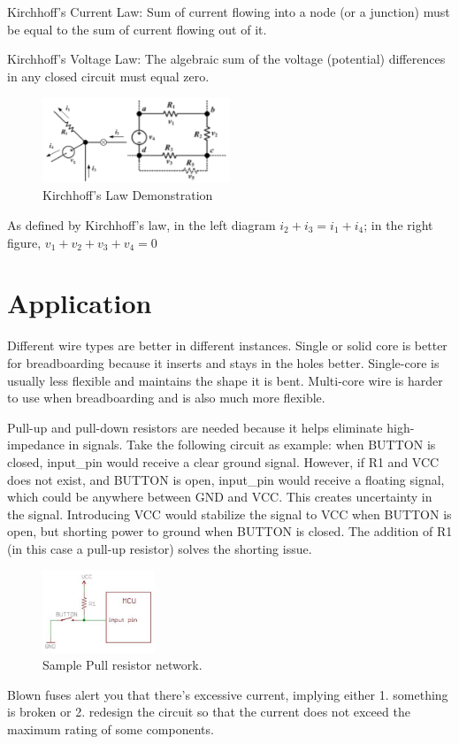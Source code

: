 \documentclass{article}
\begin{document}
Kirchhoff's Current Law: Sum of current flowing into a node (or a junction) must be equal to the sum of current flowing out of it. \par
Kirchhoff's Voltage Law: The algebraic sum of the voltage (potential) differences in any closed circuit must equal zero.

\begin{figure}[!h]
	\center
	\includegraphics[width=0.5\textwidth, keepaspectratio]{kirchof_demo}
	\caption{Kirchhoff's Law Demonstration}
	\label{fig:kirchof_demo}
\end{figure}
As defined by Kirchhoff's law, in the left diagram $i_2+i_3=i_1+i_4$; in the right figure, $v_1+v_2+v_3+v_4=0$

\section{Application}

Different wire types are better in different instances. Single or solid core is better for breadboarding because it inserts and stays in the holes better. Single-core is usually less flexible and maintains the shape it is bent. Multi-core wire is harder to use when breadboarding and is also much more flexible. \par

Pull-up and pull-down resistors are needed because it helps eliminate high-impedance in signals. Take the following circuit as example: when BUTTON is closed, input\_pin would receive a clear ground signal. However, if R1 and VCC does not exist, and BUTTON is open, input\_pin would receive a floating signal, which could be anywhere between GND and VCC. This creates uncertainty in the signal. Introducing VCC would stabilize the signal to VCC when BUTTON is open, but shorting power to ground when BUTTON is closed. The addition of R1 (in this case a pull-up resistor) solves the shorting issue.

\begin{figure}[!h]
	\center
	\includegraphics[width=0.3\textwidth, keepaspectratio]{pull}
	\caption{Sample Pull resistor network.}
	\label{fig:pull}
\end{figure}

Blown fuses alert you that there's excessive current, implying either 1. something is broken or 2. redesign the circuit so that the current does not exceed the maximum rating of some components.
\end{document}

